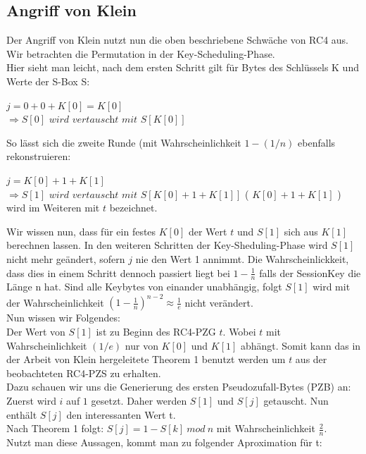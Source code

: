 \documentclass[10pt,a4paper]{article}
\begin{document}
\subsection{Angriff von Klein}\label{ssec:klein}
Der Angriff von Klein nutzt nun die oben beschriebene Schwäche von RC4 aus. Wir betrachten die Permutation in der Key-Scheduling-Phase.\\
Hier sieht man leicht, nach dem ersten Schritt gilt für Bytes des Schlüssels K und Werte der S-Box S:
\begin{center}
$ j = 0+0+K[0] = K[0] $\\
$\Rightarrow S[0] \textit{ wird vertauscht mit }  S[K[0]] $\\
\end{center}
So lässt sich die zweite Runde (mit Wahrscheinlichkeit $1 - (1/n)$ ebenfalls rekonstruieren:
\begin{center}
$ j = K[0] + 1 + K[1]$\\  
$\Rightarrow S[1] \textit{ wird vertauscht mit } S[ K[0] + 1 + K[1] ] $ ( $K[0] + 1 + K[1]$ ) wird im Weiteren mit  $t$ bezeichnet.\\
\end{center}
Wir wissen nun, dass für ein festes $K[0]$ der Wert $t$ und $S[1]$ sich aus $K[1]$ berechnen lassen.
In den weiteren Schritten der Key-Sheduling-Phase wird $S[1]$ nicht mehr geändert, sofern $j$ nie den Wert 1 annimmt.
Die Wahrscheinlickkeit, dass dies in einem Schritt dennoch passiert liegt bei $1 - \frac{1}{n}$ falls der SessionKey die Länge n hat.
Sind alle Keybytes von einander unabhängig, folgt $S[1]$ wird mit der Wahrscheinlichkeit $(1-\frac{1}{n})^{n-2} \approx \frac{1}{e}$ nicht verändert.\\
Nun wissen wir Folgendes:\\
Der Wert von $S[1]$ ist zu Beginn des RC4-PZG $t$. Wobei $t$ mit Wahrscheinlichkeit $(1/e)$ nur von $K[0]$ und $K[1]$ abhängt. Somit kann das in der Arbeit von Klein hergeleitete Theorem 1 \cite{Kle08} benutzt werden um $t$ aus der beobachteten RC4-PZS zu erhalten.\\
Dazu schauen wir uns die Generierung des ersten Pseudozufall-Bytes (PZB) an:\\
Zuerst wird $i$ auf $1$ gesetzt. Daher werden $S[1]$ und $S[j]$ getauscht. Nun enthält $S[j]$ den interessanten Wert t.\\
Nach Theorem 1 folgt: $S[j] = 1 - S[k]\ mod\ n$ mit Wahrscheinlichkeit $\frac{2}{n}$.\\
Nutzt man diese Aussagen, kommt man zu folgender Aproximation für t:
\end{document}
